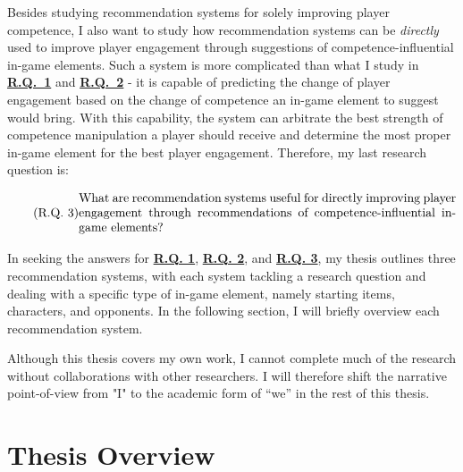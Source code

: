 Besides studying recommendation systems for solely improving player competence, I also want to study how recommendation systems can be \textit{directly} used to improve player engagement through suggestions of competence-influential in-game elements. Such a system is more complicated than what I study in \hyperref[rq1]{\textbf{R.Q.~1}} and \hyperref[rq2]{\textbf{R.Q.~2}} - it is capable of predicting the change of player engagement based on the change of competence an in-game element to suggest would bring. With this capability, the system can arbitrate the best strength of competence manipulation a player should receive and determine the most proper in-game element for the best player engagement. Therefore, my last research question is:

\begin{equation}
  \tag{R.Q. 3}\label{rq3}
  \parbox{\dimexpr\linewidth-4em}{%
    \strut
    What are recommendation systems useful for directly improving player engagement through recommendations of competence-influential in-game elements?
    \strut
  }
\end{equation}



In seeking the answers for \hyperref[rq1]{\textbf{R.Q. 1}}, \hyperref[rq2]{\textbf{R.Q. 2}}, and \hyperref[rq3]{\textbf{R.Q. 3}}, my thesis outlines three recommendation systems, with each system tackling a research question and dealing with a specific type of in-game element, namely starting items, characters, and opponents. In the following section, I will briefly overview each recommendation system.

Although this thesis covers my own work, I cannot complete much of the research without collaborations with other researchers. I will therefore shift the narrative point-of-view from "I" to the academic form of “we” in the rest of this thesis.


\section{Thesis Overview}\label{sec:thesis_overview}

